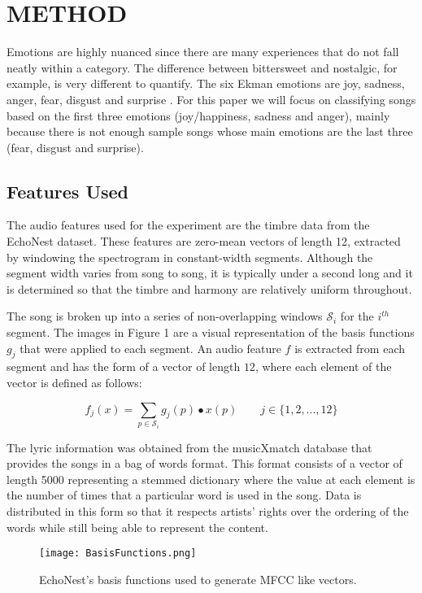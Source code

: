 \renewcommand{\chaptername}{}

\chapter{METHOD}

Emotions are highly nuanced since there are many experiences that do not fall neatly within a category. 
The difference between bittersweet and nostalgic, for example, is very different to quantify. The six Ekman emotions 
are joy, sadness, anger, fear, disgust and surprise \cite{transprose}.  For this paper we will focus on 
classifying songs based on the first three emotions (joy/happiness, sadness and anger), mainly because there is not enough sample songs whose main
emotions are the last three (fear, disgust and surprise).

\section{Features Used}

The audio features used for the experiment are the timbre data from the EchoNest dataset.
These features are zero-mean vectors of length 12,  extracted by windowing the spectrogram in constant-width segments. 
Although the segment width varies from song to song, it is typically under a second long and it is determined
so that the timbre and harmony are relatively uniform throughout.  

The song is broken up into a series of non-overlapping windows $\mathcal{S}_i$ for the $i^{th}$ segment. 
The images in Figure 1 are a visual representation of the basis functions $g_j$ that were applied to each segment. 
An audio feature $f$ is extracted from each segment and has the form of a vector of length $12$,
 where each element of the vector is defined as follows: 

\[ f_j (x) = \sum_{p \in \mathcal{S}_i} g_j(p) \bullet x(p) \qquad j \in \{1, 2, ..., 12\}\]

The lyric information was obtained from the musicXmatch database \cite{musicXmatchDataset} 
that provides the songs in a bag of words format. This format consists  of a vector of length 5000 representing 
a stemmed dictionary where the value at each element is the number of times that a particular word
is used in the song. Data is distributed in this form so that it respects artists' 
rights over the ordering of the words while still being able to represent the content. 

\begin{figure}[h!]
  \centering
      \texttt{[image: BasisFunctions.png]}
  \caption[Compact Routing Example]%
    {EchoNest's basis functions used to generate MFCC like vectors.\protect\footnotemark}

  \end{figure}
